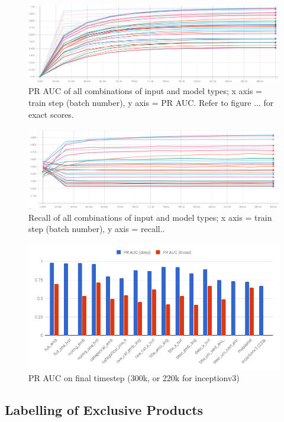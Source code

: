 \begin{figure}
  \includegraphics[width=\linewidth]{figures/pr_auc_all}
  \caption{PR AUC of all combinations of input and model types; x axis = train step (batch number), y axis = PR AUC. Refer to figure ... for exact scores.}
  \label{pr_auc_all}
\end{figure}
\begin{figure}
  \includegraphics[width=\linewidth]{figures/recall_all}
  \caption{Recall of all combinations of input and model types; x axis = train step (batch number), y axis = recall..}
  \label{recall_all}
\end{figure}

\begin{figure}
  \includegraphics[width=\linewidth]{figures/pr_auc_chart}
  \caption{PR AUC on final timestep (300k, or 220k for inceptionv3)}
  \label{pr_auc_chart}
\end{figure}

\subsection{Labelling of Exclusive Products}

